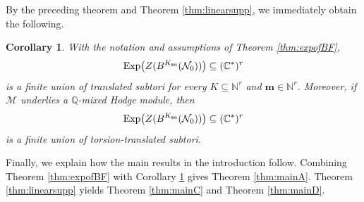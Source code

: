 \documentclass{amsart}
\theoremstyle{plain}
\numberwithin{theorem}{section}
\newtheorem{coro}[theorem]{Corollary}
\theoremstyle{definition}
\theoremstyle{remark}
\theoremstyle{definition}
\newcommand{\C}{\mathbb{C}} %
\newcommand{\N}{\mathbb{N}}
\newcommand{\Q}{\mathbb{Q}}
\newcommand{\cD}{\mathcal{D}}
\newcommand{\cF}{\mathcal{F}}
\newcommand{\cH}{\mathcal{H}}
\newcommand{\cI}{\mathcal{I}}
\newcommand{\cM}{\mathcal{M}}
\newcommand{\cN}{\mathcal{N}}
\newcommand{\cO}{\mathscr{O}}
\newcommand{\bR}{\mathbf{R}}
\newcommand{\bm}{\mathbf{m}}
\newcommand{\gr}{\textup{gr}}
\newcommand{\Mod}{\textup{Mod}}
\newcommand{\coh}{\textup{coh}}
\newcommand{\CC}{\textup{CC}}
\newcommand{\Exp}{\textup{Exp}}
\begin{document}
By the preceding theorem and Theorem \ref{thm:linearsupp}, we immediately
obtain the following.

\begin{coro}\label{cor:expofBF}
With the notation and assumptions of Theorem \ref{thm:expofBF},
\[
\Exp\big(Z(B^{K_\bm}(\cN_0))\big)
\subseteq
(\C^*)^r
\]
is a finite union of translated subtori for every
$K\subseteq \N^r$ and $\bm\in \N^r$. Moreover, if $\cM$ underlies a
$\Q$-mixed Hodge module, then
\[
\Exp\big(Z(B^{K_\bm}(\cN_0))\big)
\subseteq
(\C^*)^r
\]
is a finite union of torsion-translated subtori.
\end{coro}

Finally, we explain how the main results in the introduction follow.
Combining Theorem \ref{thm:expofBF} with Corollary \ref{cor:expofBF} gives
Theorem \ref{thm:mainA}. Theorem \ref{thm:linearsupp} yields
Theorem \ref{thm:mainC} and Theorem \ref{thm:mainD}.

   \appendix
\let\Subsection\subsection
\newcommand{\paragraphe}[1]{\refstepcounter{theorem}\subsubsection*{{\upshape\thetheorem.}\enspace#1}}

\newcommand{\bbullet}{{\scriptscriptstyle\bullet}}

\newcommand\shd{\mathcal{D}}\let\cD\shd
\newcommand\shf{\mathcal{F}}\let\cF\shf
\newcommand\shi{\mathcal{I}}\let\cI\shi
\newcommand\shh{\mathcal{H}}\let\cH\shh
\newcommand\shm{\mathcal{M}}\let\cM\shm
\newcommand\shn{\mathcal{N}}\let\cN\shn
\newcommand\sho{\mathcal{O}}\let\cO\sho

\newcommand{\NN}{\mathbb{N}}
\newcommand{\QQ}{\mathbb{Q}}
\newcommand{\ZZ}{\mathbb{Z}}

\newcommand{\bma}{\boldsymbol{a}}
\renewcommand{\bR}{\boldsymbol{R}}

\newcommand{\rd}{\mathrm{d}}
\renewcommand{\gr}{\mathrm{gr}}
\renewcommand{\coh}{\mathrm{coh}}
\renewcommand{\Mod}{\mathrm{Mod}}
\newcommand{\nb}{\mathrm{nb}}

\newcommand{\pOS}{p^{-1}\sho_S}
\newcommand{\XS}{X_S}
\newcommand{\TS}{T_S}
\newcommand{\XsS}{X^*_S}
\newcommand{\XT}{X_T}
\newcommand{\XTa}{X_{T_\alpha}}
\newcommand{\XST}{\XS\times_S\nobreak\TS}
\newcommand{\XpT}{X'_T}
\newcommand{\XTp}{X_{T'}}
\newcommand{\DXS}{\shd_{\XS/S}}
\newcommand{\DXsS}{\shd_{\XsS/S}}
\newcommand{\DXT}{\shd_{\XT/T}}
\newcommand{\DXpT}{\shd_{\XpT/T}}
\newcommand{\DXST}{\shd_{\XST/\TS}}
\newcommand{\DXSp}{\shd_{X_{S'}/S'}}
\end{document}
